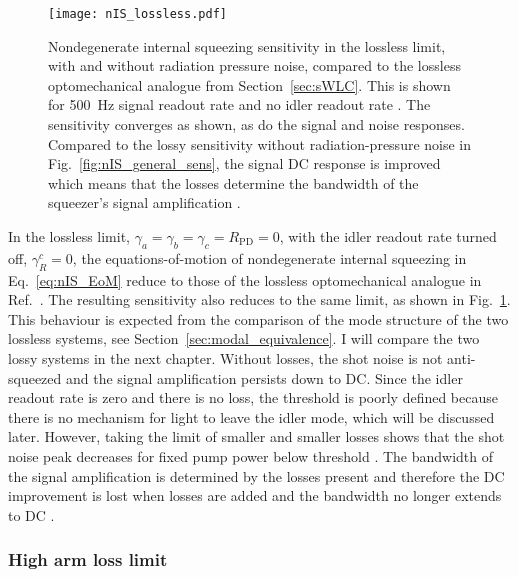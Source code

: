 \begin{figure}
	\centering
	\texttt{[image: nIS\_lossless.pdf]}
	\caption{  Nondegenerate internal squeezing sensitivity in the lossless limit, with and without radiation pressure noise, compared to the lossless optomechanical analogue from Section~\ref{sec:sWLC}. This is shown for 500~Hz signal readout rate and no idler readout rate . The sensitivity converges as shown, as do the signal and noise responses. Compared to the lossy sensitivity without radiation-pressure noise in Fig.~\ref{fig:nIS_general_sens}, the signal DC response is improved which means that the losses determine the bandwidth of the squeezer's signal amplification .  }
	\label{fig:nIS_lossless}
\end{figure}

In the lossless limit, $\gamma_a=\gamma_b=\gamma_c=R_\text{PD}=0$, with the idler readout rate turned off, $\gamma^c_R=0$, the equations-of-motion of nondegenerate internal squeezing in Eq.~\ref{eq:nIS_EoM} reduce to those of the lossless optomechanical analogue in Ref.~\cite{Li2020}. The resulting sensitivity also reduces to the same limit, as shown in Fig.~\ref{fig:nIS_lossless}. This behaviour is expected from the comparison of the mode structure of the two lossless systems, see Section~\ref{sec:modal_equivalence}.
I will compare the two lossy systems in the next chapter. 
Without losses, the shot noise is not anti-squeezed and the signal amplification persists down to DC. Since the idler readout rate is zero and there is no loss, the threshold is poorly defined because there is no mechanism for light to leave the idler mode, which will be discussed later. However, taking the limit of smaller and smaller losses shows that the shot noise peak decreases for fixed pump power below threshold . The bandwidth of the signal amplification is determined by the losses present and therefore the DC improvement is lost when losses are added and the bandwidth no longer extends to DC .


\subsubsection{High arm loss limit}
\label{sec:nOPO_reduction}

